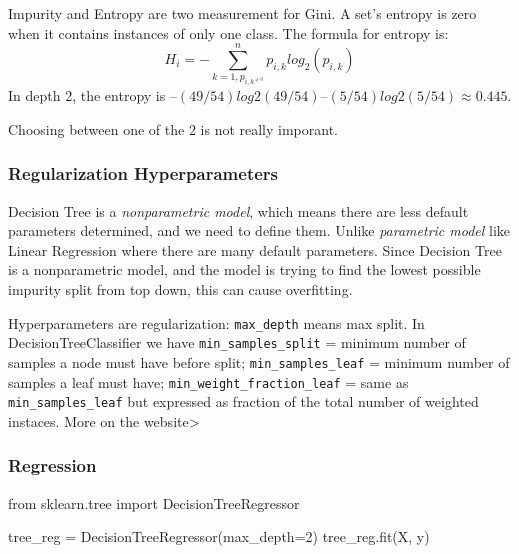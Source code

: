 \documentclass[
  letterpaper,
  DIV=11,
  numbers=noendperiod]{scrartcl}
\newenvironment{Shaded}{\begin{snugshade}}{\end{snugshade}}
\newcommand{\DecValTok}[1]{\textcolor[rgb]{0.68,0.00,0.00}{#1}}
\newcommand{\ImportTok}[1]{\textcolor[rgb]{0.00,0.46,0.62}{#1}}
\newcommand{\NormalTok}[1]{\textcolor[rgb]{0.00,0.23,0.31}{#1}}
\newcommand{\OperatorTok}[1]{\textcolor[rgb]{0.37,0.37,0.37}{#1}}
\begin{document}
Impurity and Entropy are two measurement for Gini. A set's entropy is
zero when it contains instances of only one class. The formula for
entropy is: \[
H_i = -\sum^n_{k=1, p_{i,k^{\neq 0}}}p_{i,k}log_2(p_{i,k})
\] In depth 2, the entropy is
\(–(49/54) log2 (49/54) – (5/54) log2 (5/54) ≈ 0.445\).

Choosing between one of the 2 is not really imporant.

\subsubsection{Regularization
Hyperparameters}\label{regularization-hyperparameters}

Decision Tree is a \emph{nonparametric model}, which means there are
less default parameters determined, and we need to define them. Unlike
\emph{parametric model} like Linear Regression where there are many
default parameters. Since Decision Tree is a nonparametric model, and
the model is trying to find the lowest possible impurity split from top
down, this can cause overfitting.

Hyperparameters are regularization: \texttt{max\_depth} means max split.
In DecisionTreeClassifier we have \texttt{min\_samples\_split} = minimum
number of samples a node must have before split;
\texttt{min\_samples\_leaf} = minimum number of samples a leaf must
have; \texttt{min\_weight\_fraction\_leaf} = same as
\texttt{min\_samples\_leaf} but expressed as fraction of the total
number of weighted instaces. More on the website\textgreater{}

\subsubsection{Regression}\label{regression}

\begin{Shaded}
\begin{Highlighting}[]
\ImportTok{from}\NormalTok{ sklearn.tree }\ImportTok{import}\NormalTok{ DecisionTreeRegressor}

\NormalTok{tree\_reg }\OperatorTok{=}\NormalTok{ DecisionTreeRegressor(max\_depth}\OperatorTok{=}\DecValTok{2}\NormalTok{)}
\NormalTok{tree\_reg.fit(X, y)}
\end{Highlighting}
\end{Shaded}
\end{document}
